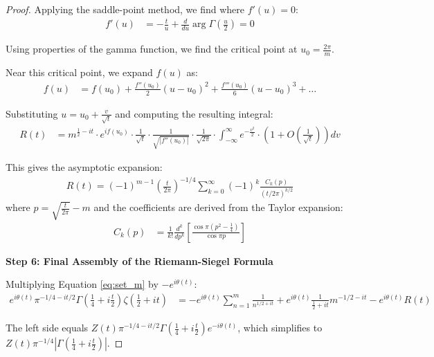 \documentclass{article}
\begin{document}
\begin{proof}
Applying the saddle-point method, we find where $f'(u) = 0$:
\begin{align}\label{eq:f_prime}
f'(u) &= -\frac{t}{u} + \frac{d}{du}\arg\Gamma\left(\frac{u}{2}\right) = 0
\end{align}

Using properties of the gamma function, we find the critical point at $u_0 = \frac{2\pi}{m}$.

Near this critical point, we expand $f(u)$ as:
\begin{align}\label{eq:f_expansion}
f(u) &= f(u_0) + \frac{f''(u_0)}{2}(u-u_0)^2 + \frac{f'''(u_0)}{6}(u-u_0)^3 + \ldots
\end{align}

Substituting $u = u_0 + \frac{v}{\sqrt{t}}$ and computing the resulting integral:
\begin{align}\label{eq:R_saddle}
R(t) &= m^{\frac{1}{2}-it} \cdot e^{if(u_0)} \cdot \frac{1}{\sqrt{t}} \cdot \frac{1}{\sqrt{|f''(u_0)|}} \cdot \frac{1}{\sqrt{2\pi}} \cdot \int_{-\infty}^{\infty} e^{-\frac{v^2}{2}} \cdot \left(1 + O\left(\frac{1}{\sqrt{t}}\right)\right) dv
\end{align}

This gives the asymptotic expansion:
\begin{align}\label{eq:R_asymptotic}
R(t) = (-1)^{m-1}\left(\frac{t}{2\pi}\right)^{-1/4}\sum_{k=0}^{\infty} (-1)^k \frac{C_k(p)}{(t/2\pi)^{k/2}}
\end{align}
where $p = \sqrt{\frac{t}{2\pi}} - m$ and the coefficients are derived from the Taylor expansion:
\begin{align}\label{eq:C_k}
C_k(p) &= \frac{1}{k!}\frac{d^k}{dp^k}\left[\frac{\cos\pi(p^2-\frac{1}{4})}{\cos\pi p}\right]
\end{align}

\textbf{Step 6: Final Assembly of the Riemann-Siegel Formula}

Multiplying Equation \eqref{eq:set_m} by $-e^{i\theta(t)}$:
\begin{align}\label{eq:multiply_by_exp}
e^{i\theta(t)}\pi^{-1/4-it/2}\Gamma\left(\frac{1}{4}+i\frac{t}{2}\right)\zeta\left(\frac{1}{2}+it\right) &= -e^{i\theta(t)}\sum_{n=1}^{m}\frac{1}{n^{1/2+it}} + e^{i\theta(t)}\frac{1}{\frac{1}{2}+it}m^{-1/2-it} - e^{i\theta(t)}R(t)
\end{align}

The left side equals $Z(t)\pi^{-1/4-it/2}\Gamma\left(\frac{1}{4}+i\frac{t}{2}\right)e^{-i\theta(t)}$, which simplifies to $Z(t)\pi^{-1/4}|\Gamma\left(\frac{1}{4}+i\frac{t}{2}\right)|$.


\end{proof}
\end{document}
